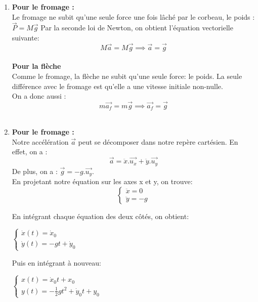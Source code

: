 \documentclass[a4paper,10pt,twoside]{article}
\begin{document}
\begin{enumerate}

    \item \textbf {Pour le fromage : } \\
     Le fromage ne subit qu'une seule force une fois lâché par le corbeau, le poids : $\vec{P} = M\vec{g}$
    Par la seconde loi de Newton, on obtient l'équation vectorielle suivante:
    \[ M\vec{a} = M\vec{g} \implies \vec{a} = \vec{g} \]
    \\
     \textbf{Pour la flèche} \\
    Comme le fromage, la flèche ne subit qu'une seule force: le poids. La seule différence avec le fromage est qu'elle a une vitesse initiale non-nulle. 
    \\ 
    On a donc aussi :
    \[m\vec{a_f}=m\vec{g} \implies \vec{a_f}=\vec{g} \]
    \\
    \item \textbf{Pour le fromage : } \\
    Notre accélération $\vec{a}$ peut se décomposer dans notre repère cartésien. En effet, on a :
    \[\vec{a}= \ddot{x}.\vec{u_x} + \ddot{y}.\vec{u_y} \]
    De plus, on a : $\vec{g}= - g. \vec{u_y}$. \\
    
    En projetant notre équation sur les axes x et y, on trouve: 
    \begin{equation}
        \begin{cases}
            \ddot{x} = 0 \\
            \ddot{y} = -g
        \end{cases}
    \end{equation}
    
    En intégrant chaque équation des deux côtés, on obtient:
    \begin{center}
        $\begin{cases}
        \dot{x}(t) = \dot{x}_0   \\
        \dot{y}(t) = -gt + \dot{y}_0        \end{cases}$
    \end{center}
    Puis en intégrant à nouveau:
     \begin{center}
        $\begin{cases}
        x(t) = \dot{x}_0t + x_0 \\
        y(t) = -\frac{1}{2}gt^2 + \dot{y}_0t + y_0
        \end{cases}$
    \end{center}
    

\end{enumerate}
\end{document}
